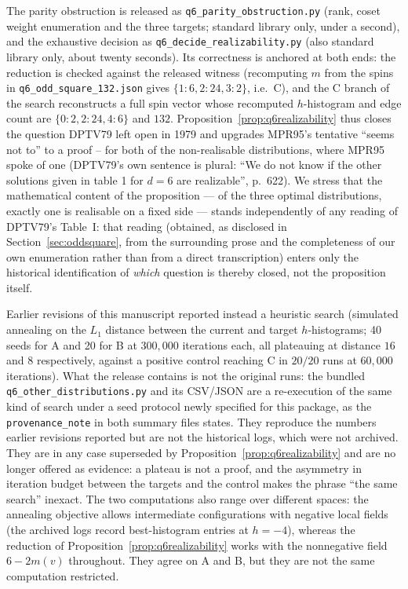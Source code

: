 \documentclass[12pt]{article}
\begin{document}
The parity obstruction is released as
\texttt{q6\_parity\_obstruction.py} (rank, coset weight enumeration and the
three targets; standard library only, under a second), and the exhaustive
decision as \texttt{q6\_decide\_realizability.py} (also standard library only,
about twenty seconds).
Its correctness is anchored at both ends: the reduction is checked against the
released witness (recomputing $m$ from the spins in
\texttt{q6\_odd\_square\_132.json} gives $\{1{:}6,2{:}24,3{:}2\}$, i.e.\ C), and
the C branch of the search reconstructs a full spin vector whose recomputed
$h$-histogram and edge count are $\{0{:}2,2{:}24,4{:}6\}$ and $132$.
Proposition~\ref{prop:q6realizability} thus closes the question DPTV79 left open
in 1979 and upgrades MPR95's tentative ``seems not to'' to a proof --
for both of the non-realisable distributions, where MPR95 spoke of one
(DPTV79's own sentence is plural: ``We do not know if the other solutions
given in table 1 for $d=6$ are realizable'', p.~622). We stress that the
mathematical content of the proposition --- of the three optimal
distributions, exactly one is realisable on a fixed side --- stands
independently of any reading of DPTV79's Table~I: that reading (obtained,
as disclosed in Section~\ref{sec:oddsquare}, from the surrounding prose
and the completeness of our own enumeration rather than from a direct
transcription) enters only the historical identification of \emph{which}
question is thereby closed, not the proposition itself.

Earlier revisions of this manuscript reported instead a heuristic search
(simulated annealing on the $L_1$ distance between the current and target
$h$-histograms; 40 seeds for A and 20 for B at $300{,}000$ iterations each,
all plateauing at distance $16$ and $8$ respectively, against a positive control
reaching C in $20/20$ runs at $60{,}000$ iterations). What the release contains is not the original runs: the bundled
\texttt{q6\_other\_distributions.py} and its CSV/JSON are a re-execution of the
same kind of search under a seed protocol newly specified for this package, as
the \texttt{provenance\_note} in both summary files states. They reproduce the
numbers earlier revisions reported but are not the historical logs, which were
not archived. They are in any case superseded by
Proposition~\ref{prop:q6realizability} and are no longer offered as evidence:
a plateau is not a proof, and the asymmetry in iteration budget between the
targets and the control makes the phrase ``the same search'' inexact. The two
computations also range over different spaces: the annealing objective allows
intermediate configurations with negative local fields (the archived logs
record best-histogram entries at $h=-4$), whereas the reduction of
Proposition~\ref{prop:q6realizability} works with the nonnegative field
$6-2m(v)$ throughout. They agree on A and B, but they are not the same
computation restricted.
\end{document}
